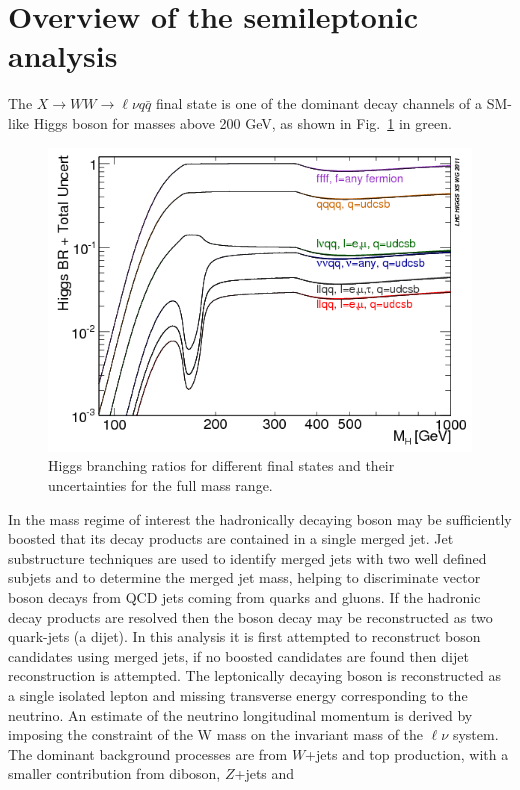 \section{Overview of the semileptonic analysis}
The $X \to WW \to \ell \nu q \bar{q}$ final state is one of the
dominant decay channels of a SM-like Higgs boson for masses above 200
GeV, as shown in Fig.~\ref{BRTotalUncertBands4f2} in green.
\begin{figure}
\centering
\includegraphics[scale= 0.65]{../Cap5/BRTotalUncertBands4f2}
\caption{Higgs branching ratios for different final states and their uncertainties for the full mass range.}
\label{BRTotalUncertBands4f2}
\end{figure}
In the mass regime of interest the hadronically decaying boson may be sufficiently boosted that
its decay products are contained in a single merged jet. Jet substructure techniques are used
to identify merged jets with two well defined subjets and to determine the merged jet mass,
helping to discriminate vector boson decays from QCD jets coming from quarks and gluons. If
the hadronic decay products are resolved then the boson decay may be reconstructed as two
quark-jets (a dijet). In this analysis it is first attempted to reconstruct boson candidates using
merged jets, if no boosted candidates are found then dijet reconstruction is attempted.
The leptonically decaying boson is reconstructed as a single isolated lepton and missing transverse energy
corresponding to the neutrino. An estimate of the neutrino longitudinal
momentum is derived by imposing the constraint of the W mass on the invariant mass of the $\ell \nu$ system.
The dominant background processes
are from $W$+jets and top production, with a smaller contribution from diboson, $Z$+jets and
